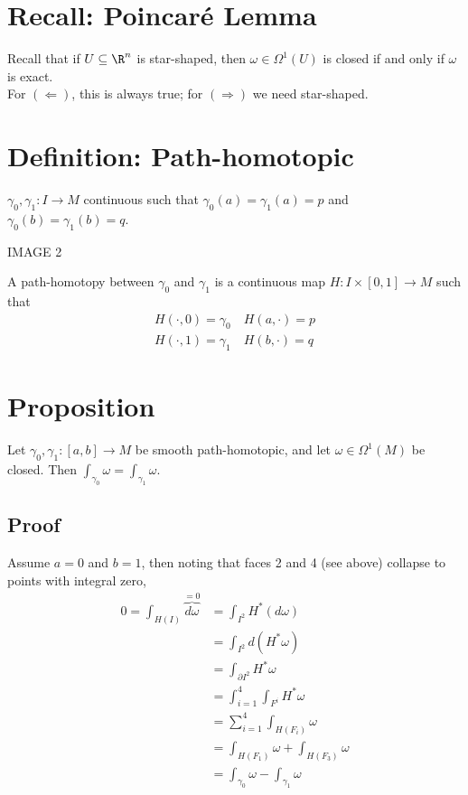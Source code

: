 \documentclass[11pt]{article}
\begin{document}
\section*{Recall: Poincaré Lemma}
\label{sec:orgc6585a1}
Recall that if \(U\subseteq\R^{n}\) is star-shaped, then \(\omega\in\Omega^{1}(U)\) is closed if and only if \(\omega\) is exact.\\
For \((\Longleftarrow)\), this is always true; for \((\Longrightarrow)\) we need star-shaped.\\
\section*{Definition: Path-homotopic}
\label{sec:org5f4c63e}
\(\gamma_{0},\gamma_{1}:I\to M\) continuous such that \(\gamma_{0}(a)=\gamma_{1}(a)=p\) and \(\gamma_{0}(b)=\gamma_{1}(b)=q\).\\
\begin{center}
IMAGE 2\\
\end{center}
A path-homotopy between \(\gamma_{0}\) and \(\gamma_{1}\) is a continuous map \(H:I\times[0,1]\to M\) such that\\
\begin{align*}
  H(\cdot,0)=\gamma_{0} \quad H(a,\cdot)=p \\
  H(\cdot,1)=\gamma_{1} \quad H(b,\cdot)=q
\end{align*}
\section*{Proposition}
\label{sec:orgc05b32d}
Let \(\gamma_{0},\gamma_{1}:[a,b]\to M\) be smooth path-homotopic, and let \(\omega\in\Omega^{1}(M)\) be closed. Then \(\int_{\gamma_{0}}\omega=\int_{\gamma_{1}}\omega\).\\
\subsection*{Proof}
\label{sec:org869a62d}
Assume \(a=0\) and \(b=1\), then noting that faces 2 and 4 (see above) collapse to points with integral zero,\\
\begin{align*}
  0
  =\int_{H(I)}\overbrace{d\omega}^{=0}
  &=\int_{I^{2}}H^{*}(d\omega) \\
  &=\int_{I^{2}}d(H^{*}\omega) \\
  &=\int_{\partial I^{2}}H^{*}\omega \\
  &=\int_{i=1}^{4}\int_{F^{i}}H^{*}\omega \\
  &=\sum_{i=1}^{4}\int_{H(F_{i})}\omega \\
  &=\int_{H(F_{1})}\omega+\int_{H(F_{3})}\omega \\
  &=\int_{\gamma_{0}}\omega-\int_{\gamma_{1}}\omega
\end{align*}
\end{document}
